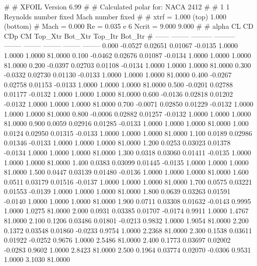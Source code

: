 #  
#       XFOIL         Version 6.99
#  
# Calculated polar for: NACA 2412                                       
#  
# 1 1 Reynolds number fixed          Mach number fixed         
#  
# xtrf =   1.000 (top)        1.000 (bottom)  
# Mach =   0.000     Re =     0.035 e 6     Ncrit =   9.000  9.000
#  
#   alpha    CL        CD       CDp       CM     Top_Xtr  Bot_Xtr  Top_Itr  Bot_Itr
#  ------ -------- --------- --------- -------- -------- -------- -------- --------
   0.000  -0.0527   0.02651   0.01067  -0.0135   1.0000   1.0000   1.0000  81.0000
   0.100  -0.0462   0.02676   0.01087  -0.0134   1.0000   1.0000   1.0000  81.0000
   0.200  -0.0397   0.02703   0.01108  -0.0134   1.0000   1.0000   1.0000  81.0000
   0.300  -0.0332   0.02730   0.01130  -0.0133   1.0000   1.0000   1.0000  81.0000
   0.400  -0.0267   0.02758   0.01153  -0.0133   1.0000   1.0000   1.0000  81.0000
   0.500  -0.0201   0.02788   0.01177  -0.0132   1.0000   1.0000   1.0000  81.0000
   0.600  -0.0136   0.02818   0.01202  -0.0132   1.0000   1.0000   1.0000  81.0000
   0.700  -0.0071   0.02850   0.01229  -0.0132   1.0000   1.0000   1.0000  81.0000
   0.800  -0.0006   0.02882   0.01257  -0.0132   1.0000   1.0000   1.0000  81.0000
   0.900   0.0059   0.02916   0.01285  -0.0133   1.0000   1.0000   1.0000  81.0000
   1.000   0.0124   0.02950   0.01315  -0.0133   1.0000   1.0000   1.0000  81.0000
   1.100   0.0189   0.02986   0.01346  -0.0133   1.0000   1.0000   1.0000  81.0000
   1.200   0.0253   0.03023   0.01378  -0.0134   1.0000   1.0000   1.0000  81.0000
   1.300   0.0318   0.03060   0.01411  -0.0135   1.0000   1.0000   1.0000  81.0000
   1.400   0.0383   0.03099   0.01445  -0.0135   1.0000   1.0000   1.0000  81.0000
   1.500   0.0447   0.03139   0.01480  -0.0136   1.0000   1.0000   1.0000  81.0000
   1.600   0.0511   0.03179   0.01516  -0.0137   1.0000   1.0000   1.0000  81.0000
   1.700   0.0575   0.03221   0.01553  -0.0139   1.0000   1.0000   1.0000  81.0000
   1.800   0.0639   0.03263   0.01591  -0.0140   1.0000   1.0000   1.0000  81.0000
   1.900   0.0711   0.03308   0.01632  -0.0143   0.9995   1.0000   1.0275  81.0000
   2.000   0.0931   0.03385   0.01707  -0.0174   0.9911   1.0000   1.4767  81.0000
   2.100   0.1206   0.03486   0.01801  -0.0213   0.9832   1.0000   1.9054  81.0000
   2.200   0.1372   0.03548   0.01860  -0.0233   0.9754   1.0000   2.2368  81.0000
   2.300   0.1538   0.03611   0.01922  -0.0252   0.9676   1.0000   2.5486  81.0000
   2.400   0.1773   0.03697   0.02002  -0.0283   0.9602   1.0000   2.8423  81.0000
   2.500   0.1964   0.03774   0.02070  -0.0306   0.9531   1.0000   3.1030  81.0000
